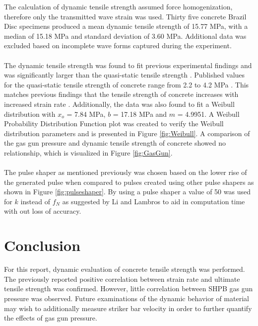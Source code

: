 \documentclass[12pt]{article}
\begin{document}
The calculation of dynamic tensile strength assumed force homogenization, therefore only the transmitted wave strain was used. Thirty five concrete Brazil Disc specimens produced a mean dynamic tensile strength of 15.77 MPa, with a median of 15.18 MPa and standard deviation of 3.60 MPa. Additional data was excluded based on incomplete wave forms captured during the experiment. 
\\ \\
The dynamic tensile strength was found to fit previous experimental findings and was significantly larger than the quasi-static tensile strength \cite{Jin2017}. Published values for the quasi-static tensile strength of concrete range from 2.2 to 4.2 MPa \cite{Concrete}. This matches previous findings that the tensile strength of concrete increases with increased strain rate \cite{Jin2017} \cite{Grote}. Additionally, the data was also found to fit a Weibull distribution with $x_{o}$ = 7.84 MPa, $b$ = 17.18 MPa and $m$ = 4.9951. A Weibull Probability Distribution Function plot was created to verify the Weibull distribution parameters and is presented in Figure \ref{fig:Weibull}. A comparison of the gas gun pressure and dynamic tensile strength of concrete showed no relationship, which is visualized in Figure \ref{fig:GasGun}.  
\\ \\
The pulse shaper as mentioned previously was chosen based on the lower rise of the generated pulse when compared to pulses created using other pulse shapers as shown in Figure \ref{fig:pulseshaper}. By using a pulse shaper a value of 50 was used for $k$ instead of $f_N$ as suggested by Li and Lambros \cite{Li} to aid in computation time with out loss of accuracy.

\section{Conclusion} %

For this report, dynamic evaluation of concrete tensile strength was performed. The previously reported positive correlation between strain rate and ultimate tensile strength was confirmed. However, little correlation between SHPB gas gun pressure was observed. Future examinations of the dynamic behavior of material may wish to additionally measure striker bar velocity in order to further quantify the effects of gas gun pressure. 
\end{document}
